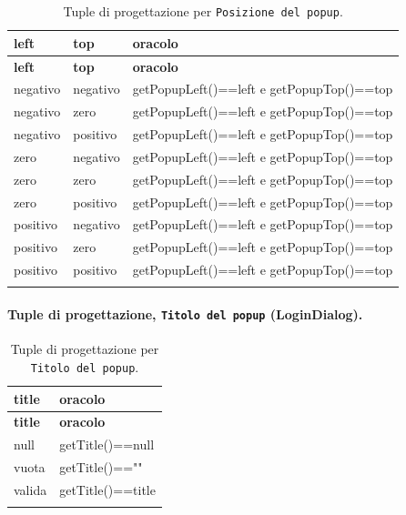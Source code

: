 {\footnotesize\setlength{\tabcolsep}{3pt}
\begin{longtable}{>{\raggedright\arraybackslash}p{}>{\raggedright\arraybackslash}p{}>{\raggedright\arraybackslash}p{}}
\toprule
\textbf{left} & \textbf{top} & \textbf{oracolo} \\
\midrule
\endfirsthead
\toprule
\textbf{left} & \textbf{top} & \textbf{oracolo} \\
\midrule
\endhead
\bottomrule
\endfoot
negativo & negativo & getPopupLeft()==left e getPopupTop()==top \\
negativo & zero & getPopupLeft()==left e getPopupTop()==top \\
negativo & positivo & getPopupLeft()==left e getPopupTop()==top \\
zero & negativo & getPopupLeft()==left e getPopupTop()==top \\
zero & zero & getPopupLeft()==left e getPopupTop()==top \\
zero & positivo & getPopupLeft()==left e getPopupTop()==top \\
positivo & negativo & getPopupLeft()==left e getPopupTop()==top \\
positivo & zero & getPopupLeft()==left e getPopupTop()==top \\
positivo & positivo & getPopupLeft()==left e getPopupTop()==top \\
\bottomrule
\caption{Tuple di progettazione per \texttt{Posizione del popup}.}
\label{tab:logindialog-posizione-tuple}
\end{longtable}
}



\paragraph*{Tuple di progettazione, \texttt{Titolo del popup} (LoginDialog).}

{\footnotesize\setlength{\tabcolsep}{3pt}
\begin{longtable}{>{\raggedright\arraybackslash}p{}>{\raggedright\arraybackslash}p{}}
\toprule
\textbf{title} & \textbf{oracolo} \\
\midrule
\endfirsthead
\toprule
\textbf{title} & \textbf{oracolo} \\
\midrule
\endhead
\bottomrule
\endfoot
null & getTitle()==null \\
vuota & getTitle()=="" \\
valida & getTitle()==title \\
\bottomrule
\caption{Tuple di progettazione per \texttt{Titolo del popup}.}
\label{tab:logindialog-title-tuple}
\end{longtable}
}



